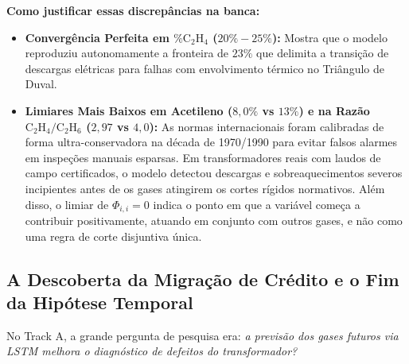 \documentclass[11pt,a4paper]{article}
\begin{document}
\textbf{Como justificar essas discrepâncias na banca:}
\begin{itemize}[leftmargin=*]
  \item \textbf{Convergência Perfeita em $\% \text{C}_2\text{H}_4$ ($20\% - 25\%$):} Mostra que o modelo reproduziu autonomamente a fronteira de $23\%$ que delimita a transição de descargas elétricas para falhas com envolvimento térmico no Triângulo de Duval.
  \item \textbf{Limiares Mais Baixos em Acetileno ($8{,}0\%$ vs $13\%$) e na Razão $\text{C}_2\text{H}_4/\text{C}_2\text{H}_6$ ($2{,}97$ vs $4{,}0$):} As normas internacionais foram calibradas de forma ultra-conservadora na década de 1970/1990 para evitar falsos alarmes em inspeções manuais esparsas. Em transformadores reais com laudos de campo certificados, o modelo detectou descargas e sobreaquecimentos severos incipientes antes de os gases atingirem os cortes rígidos normativos. Além disso, o limiar de $\Phi_{i, i} = 0$ indica o ponto em que a variável começa a contribuir positivamente, atuando em conjunto com outros gases, e não como uma regra de corte disjuntiva única.
\end{itemize}

\subsection{A Descoberta da Migração de Crédito e o Fim da Hipótese Temporal}

No Track A, a grande pergunta de pesquisa era: \textit{a previsão dos gases futuros via LSTM melhora o diagnóstico de defeitos do transformador?}
\end{document}
